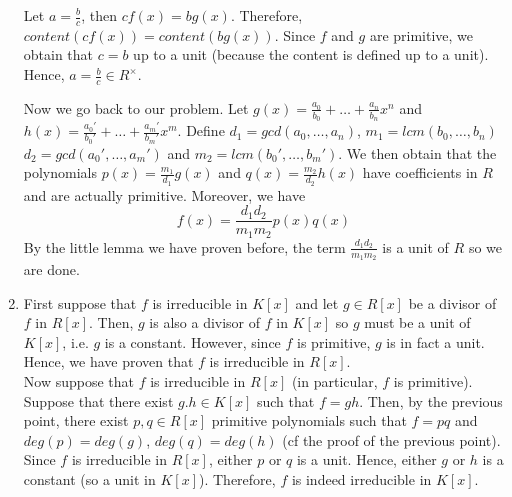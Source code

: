 \documentclass[12pt,a4paper]{article}
\begin{document}
\begin{enumerate}
Let $a = \frac{b}{c}$, then $cf(x) = bg(x)$. Therefore, $content(cf(x)) = content(bg(x))$. Since $f$ and $g$ are primitive, we obtain that $c = b$ up to a unit (because the content is defined up to a unit). Hence, $a = \frac{b}{c} \in R^\times$. 

Now we go back to our problem. Let $g(x) = \frac{a_0}{b_0} + \dots + \frac{a_n}{b_n}x^n$ and $h(x) = \frac{a_0'}{b_0'} + \dots + \frac{a_m'}{b_m'}x^m$. Define $d_1 = gcd(a_0, \dots, a_n)$, $m_1 = lcm(b_0, \dots, b_n)$ $d_2 = gcd(a_0', \dots, a_m')$ and $m_2 = lcm(b_0', \dots, b_m')$. We then obtain that the polynomials $p(x) = \frac{m_1}{d_1}g(x)$ and $q(x) = \frac{m_2}{d_2}h(x)$ have coefficients in $R$ and are actually primitive. Moreover, we have \[ f(x) = \frac{d_1d_2}{m_1m_2}p(x)q(x) \] By the little lemma we have proven before, the term $\frac{d_1d_2}{m_1m_2}$ is a unit of $R$ so we are done.

\item First suppose that $f$ is irreducible in $K[x]$ and let $g \in R[x]$ be a divisor of $f$ in $R[x]$. Then, $g$ is also a divisor of $f$ in $K[x]$ so $g$ must be a unit of $K[x]$, i.e. $g$ is a constant. However, since $f$ is primitive, $g$ is in fact a unit. Hence, we have proven that $f$ is irreducible in $R[x]$. \\
Now suppose that $f$ is irreducible in $R[x]$ (in particular, $f$ is primitive). Suppose that there exist $g. h \in K[x]$ such that $f = gh$. Then, by the previous point, there exist $p, q \in R[x]$ primitive polynomials such that $f = pq$ and $deg(p) = deg(g)$, $deg(q) = deg(h)$ (cf the proof of the previous point). Since $f$ is irreducible in $R[x]$, either $p$ or $q$ is a unit. Hence, either $g$ or $h$ is a constant (so a unit in $K[x]$). Therefore, $f$ is indeed irreducible in $K[x]$.


\end{enumerate}
\end{document}
